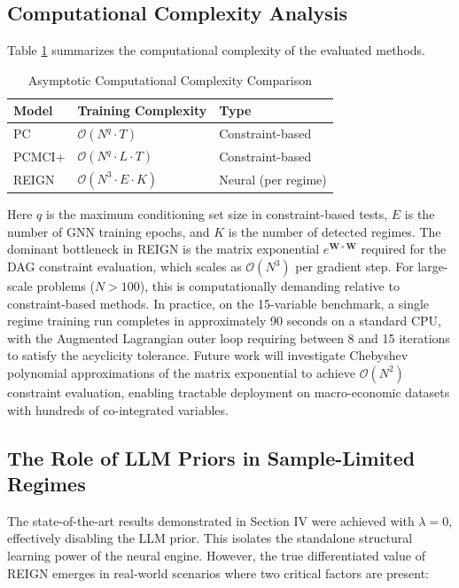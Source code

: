 \subsection{Computational Complexity Analysis}

Table \ref{tab:complexity} summarizes the computational complexity of the evaluated methods.

\begin{table}[htbp]
\centering
\caption{Asymptotic Computational Complexity Comparison}
\label{tab:complexity}
\begin{tabular}{lll}
\toprule
\textbf{Model} & \textbf{Training Complexity} & \textbf{Type} \\
\midrule
PC        & $\mathcal{O}(N^q \cdot T)$    & Constraint-based \\
PCMCI+    & $\mathcal{O}(N^q \cdot L \cdot T)$ & Constraint-based \\
REIGN     & $\mathcal{O}(N^3 \cdot E \cdot K)$ & Neural (per regime) \\
\bottomrule
\end{tabular}
\end{table}

Here $q$ is the maximum conditioning set size in constraint-based tests, $E$ is the number of GNN training epochs, and $K$ is the number of detected regimes. The dominant bottleneck in REIGN is the matrix exponential $e^{\mathbf{W} \circ \mathbf{W}}$ required for the DAG constraint evaluation, which scales as $\mathcal{O}(N^3)$ per gradient step. For large-scale problems ($N > 100$), this is computationally demanding relative to constraint-based methods. In practice, on the 15-variable benchmark, a single regime training run completes in approximately 90 seconds on a standard CPU, with the Augmented Lagrangian outer loop requiring between 8 and 15 iterations to satisfy the acyclicity tolerance. Future work will investigate Chebyshev polynomial approximations of the matrix exponential to achieve $\mathcal{O}(N^2)$ constraint evaluation, enabling tractable deployment on macro-economic datasets with hundreds of co-integrated variables.

\subsection{The Role of LLM Priors in Sample-Limited Regimes}

The state-of-the-art results demonstrated in Section IV were achieved with $\lambda=0$, effectively disabling the LLM prior. This isolates the standalone structural learning power of the neural engine. However, the true differentiated value of REIGN emerges in real-world scenarios where two critical factors are present:

